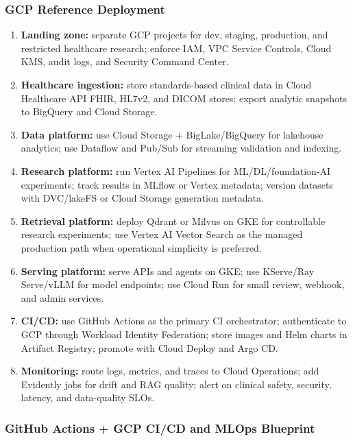 \subsubsection{GCP Reference Deployment}

\begin{enumerate}
  \item \textbf{Landing zone:} separate GCP projects for dev, staging, production, and restricted healthcare research; enforce IAM, VPC Service Controls, Cloud KMS, audit logs, and Security Command Center.
  \item \textbf{Healthcare ingestion:} store standards-based clinical data in Cloud Healthcare API FHIR, HL7v2, and DICOM stores; export analytic snapshots to BigQuery and Cloud Storage.
  \item \textbf{Data platform:} use Cloud Storage + BigLake/BigQuery for lakehouse analytics; use Dataflow and Pub/Sub for streaming validation and indexing.
  \item \textbf{Research platform:} run Vertex AI Pipelines for ML/DL/foundation-AI experiments; track results in MLflow or Vertex metadata; version datasets with DVC/lakeFS or Cloud Storage generation metadata.
  \item \textbf{Retrieval platform:} deploy Qdrant or Milvus on GKE for controllable research experiments; use Vertex AI Vector Search as the managed production path when operational simplicity is preferred.
  \item \textbf{Serving platform:} serve APIs and agents on GKE; use KServe/Ray Serve/vLLM for model endpoints; use Cloud Run for small review, webhook, and admin services.
  \item \textbf{CI/CD:} use GitHub Actions as the primary CI orchestrator; authenticate to GCP through Workload Identity Federation; store images and Helm charts in Artifact Registry; promote with Cloud Deploy and Argo CD.
  \item \textbf{Monitoring:} route logs, metrics, and traces to Cloud Operations; add Evidently jobs for drift and RAG quality; alert on clinical safety, security, latency, and data-quality SLOs.
\end{enumerate}

\subsubsection{GitHub Actions + GCP CI/CD and MLOps Blueprint}

